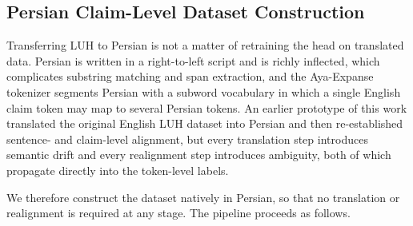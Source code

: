 \documentclass[review]{elsarticle}
\begin{document}
\subsection{Persian Claim-Level Dataset Construction}

Transferring LUH to Persian is not a matter of retraining the head on translated data. Persian is written in a right-to-left script and is richly inflected, which complicates substring matching and span extraction, and the Aya-Expanse tokenizer segments Persian with a subword vocabulary in which a single English claim token may map to several Persian tokens. An earlier prototype of this work translated the original English LUH dataset into Persian and then re-established sentence- and claim-level alignment, but every translation step introduces semantic drift and every realignment step introduces ambiguity, both of which propagate directly into the token-level labels.

We therefore construct the dataset natively in Persian, so that no translation or realignment is required at any stage. The pipeline proceeds as follows.
\end{document}
